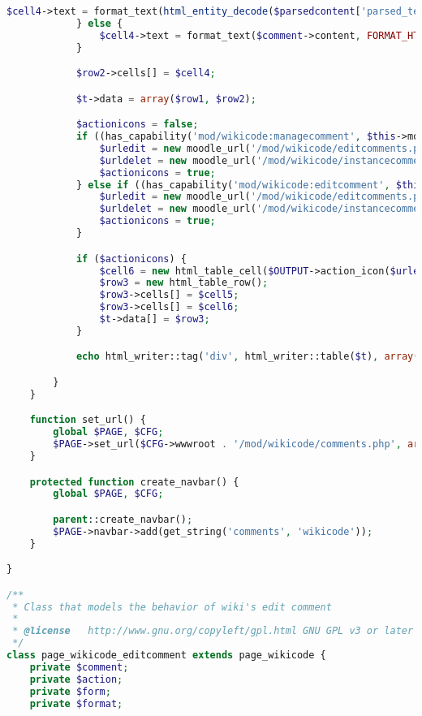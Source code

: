 \begin{lstlisting}[language=PHP]
                $cell4->text = format_text(html_entity_decode($parsedcontent['parsed_text']), FORMAT_HTML);
            } else {
                $cell4->text = format_text($comment->content, FORMAT_HTML);
            }

            $row2->cells[] = $cell4;

            $t->data = array($row1, $row2);

            $actionicons = false;
            if ((has_capability('mod/wikicode:managecomment', $this->modcontext))) {
                $urledit = new moodle_url('/mod/wikicode/editcomments.php', array('commentid' => $comment->id, 'pageid' => $page->id, 'action' => 'edit'));
                $urldelet = new moodle_url('/mod/wikicode/instancecomments.php', array('commentid' => $comment->id, 'pageid' => $page->id, 'action' => 'delete'));
                $actionicons = true;
            } else if ((has_capability('mod/wikicode:editcomment', $this->modcontext)) and ($USER->id == $user->id)) {
                $urledit = new moodle_url('/mod/wikicode/editcomments.php', array('commentid' => $comment->id, 'pageid' => $page->id, 'action' => 'edit'));
                $urldelet = new moodle_url('/mod/wikicode/instancecomments.php', array('commentid' => $comment->id, 'pageid' => $page->id, 'action' => 'delete'));
                $actionicons = true;
            }

            if ($actionicons) {
                $cell6 = new html_table_cell($OUTPUT->action_icon($urledit, new pix_icon('t/edit', get_string('edit'))) . $OUTPUT->action_icon($urldelet, new pix_icon('t/delete', get_string('delete'))));
                $row3 = new html_table_row();
                $row3->cells[] = $cell5;
                $row3->cells[] = $cell6;
                $t->data[] = $row3;
            }

            echo html_writer::tag('div', html_writer::table($t), array('class'=>'no-overflow'));

        }
    }

    function set_url() {
        global $PAGE, $CFG;
        $PAGE->set_url($CFG->wwwroot . '/mod/wikicode/comments.php', array('pageid' => $this->page->id));
    }

    protected function create_navbar() {
        global $PAGE, $CFG;

        parent::create_navbar();
        $PAGE->navbar->add(get_string('comments', 'wikicode'));
    }

}

/**
 * Class that models the behavior of wiki's edit comment
 *
 * @license   http://www.gnu.org/copyleft/gpl.html GNU GPL v3 or later
 */
class page_wikicode_editcomment extends page_wikicode {
    private $comment;
    private $action;
    private $form;
    private $format;


\end{lstlisting}
